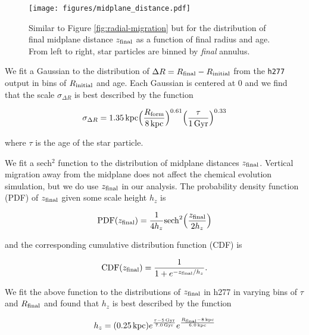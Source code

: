 \documentclass[twocolumn,linenumbers,twocolappendix]{aastex631}
\begin{document}
\begin{figure*}
    \centering
    \texttt{[image: figures/midplane\_distance.pdf]}
    \caption{Similar to Figure \ref{fig:radial-migration} but for the distribution of final midplane distance $z_{\rm final}$ as a function of final radius and age. From left to right, star particles are binned by \textit{final} annulus.}
    \label{fig:midplane-distance}
\end{figure*}

We fit a Gaussian to the distribution of $\Delta R = R_{\rm final} - R_{\rm initial}$ from the \texttt{h277} output in bins of $R_{\rm initial}$ and age. Each Gaussian is centered at 0 and we find that the scale $\sigma_{\Delta R}$ is best described by the function

\begin{equation}
    \sigma_{\Delta R} = 1.35\,{\rm kpc} \Big(\frac{R_{\rm form}}{8\,{\rm kpc}}\Big)^{0.61} \Big(\frac{\tau}{1\,{\rm Gyr}}\Big)^{0.33}
    \label{eq:radial-migration}
\end{equation}

\noindent where $\tau$ is the age of the star particle. 

We fit a sech$^2$ function \citep{Spitzer1942} to the distribution of midplane distances $z_{\rm final}$. Vertical migration away from the midplane does not affect the chemical evolution simulation, but we do use $z_{\rm final}$ in our analysis. The probability density function (PDF) of $z_{\rm final}$ given some scale height $h_z$ is

\begin{equation}
    {\rm PDF}(z_{\rm final}) = \frac{1}{4 h_z} {\rm sech}^2\Big(\frac{z_{\rm final}}{2 h_z}\Big)
    \label{eq:sech-pdf}
\end{equation}

\noindent and the corresponding cumulative distribution function (CDF) is

\begin{equation}
    {\rm CDF}(z_{\rm final}) = \frac{1}{1 + e^{-z_{\rm final} / h_z}}.
    \label{eq:sech-cdf}
\end{equation}

\noindent We fit the above function to the distributions of $z_{\rm final}$ in h277 in varying bins of $\tau$ and $R_{\rm final}$ and found that $h_z$ is best described by the function

\begin{equation}
    h_z = (0.25\,{\rm kpc}) 
    e^{\frac{\tau-5\,{\rm Gyr}}{7.0\,{\rm Gyr}}}
    e^{\frac{R_{\rm final}-8\,{\rm kpc}}{6.0\,{\rm kpc}}}
    \label{eq:scale-height}
\end{equation}
\end{document}
